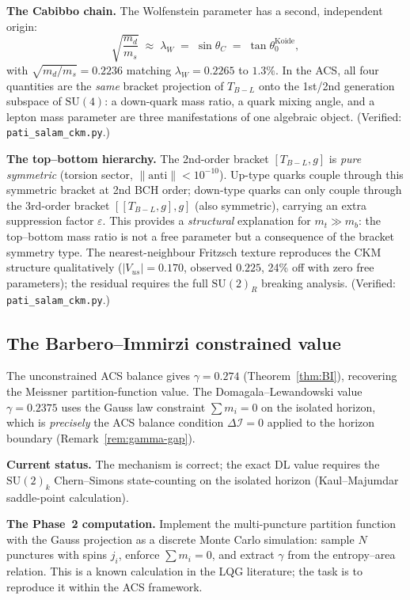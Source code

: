 \documentclass[11pt,a4paper]{article}
\theoremstyle{plain}
\theoremstyle{definition}
\theoremstyle{remark}
\newcommand{\DI}{\Delta\mathcal{I}}
\begin{document}
\textbf{The Cabibbo chain.}
The Wolfenstein parameter has a second, independent origin:
\begin{equation}\label{eq:cabibbo-chain}
  \sqrt{\frac{m_d}{m_s}} \;\approx\; \lambda_W \;=\; \sin\theta_C
  \;=\; \tan\theta_0^{\mathrm{Koide}},
\end{equation}
with $\sqrt{m_d/m_s} = 0.2236$ matching $\lambda_W = 0.2265$
to $1.3\%$.  In the ACS, all four quantities are the \emph{same}
bracket projection of $T_{B{-}L}$ onto the 1st/2nd generation
subspace of $\mathrm{SU}(4)$: a down-quark mass ratio, a quark mixing
angle, and a lepton mass parameter are three manifestations of one
algebraic object.
(Verified: \texttt{pati\_salam\_ckm.py}.)

\textbf{The top--bottom hierarchy.}
The 2nd-order bracket $[T_{B{-}L}, g]$ is \emph{pure symmetric}
(torsion sector, $\|\mathrm{anti}\| < 10^{-10}$).
Up-type quarks couple through this symmetric bracket at 2nd BCH
order; down-type quarks can only couple through the 3rd-order bracket
$[[T_{B{-}L},g],g]$ (also symmetric), carrying an extra suppression
factor $\varepsilon$.  This provides a \emph{structural} explanation
for $m_t \gg m_b$: the top--bottom mass ratio is not a free parameter
but a consequence of the bracket symmetry type.
The nearest-neighbour Fritzsch texture reproduces the CKM structure
qualitatively ($|V_{us}| = 0.170$, observed $0.225$, 24\% off with
zero free parameters); the residual requires the full
$\mathrm{SU}(2)_R$ breaking analysis.
(Verified: \texttt{pati\_salam\_ckm.py}.)

\subsection{The Barbero--Immirzi constrained value}

The unconstrained ACS balance gives $\gamma = 0.274$ (Theorem~\ref{thm:BI}),
recovering the Meissner partition-function value.  The Domagala--Lewandowski value
$\gamma = 0.2375$ uses the Gauss law constraint $\sum m_i = 0$ on the
isolated horizon, which is \emph{precisely} the ACS balance condition
$\DI = 0$ applied to the horizon boundary
(Remark~\ref{rem:gamma-gap}).

\textbf{Current status.}
The mechanism is correct; the exact DL value requires the
$\mathrm{SU}(2)_k$ Chern--Simons state-counting on the isolated
horizon (Kaul--Majumdar saddle-point calculation).

\textbf{The Phase~2 computation.}
Implement the multi-puncture partition function with the Gauss
projection as a discrete Monte Carlo simulation: sample $N$ punctures
with spins $j_i$, enforce $\sum m_i = 0$, and extract $\gamma$ from the
entropy--area relation.  This is a known calculation in the LQG literature;
the task is to reproduce it within the ACS framework.
\end{document}
